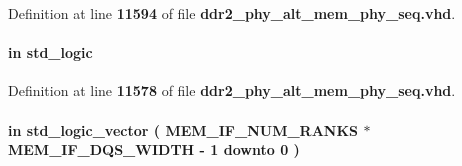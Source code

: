 Definition at line {\bf 11594} of file {\bf ddr2\+\_\+phy\+\_\+alt\+\_\+mem\+\_\+phy\+\_\+seq.\+vhd}.

\paragraph[{clk}]{ {\bfseries \textcolor{keywordflow}{in}\textcolor{vhdlchar}{ }} {\bfseries \textcolor{comment}{std\+\_\+logic}\textcolor{vhdlchar}{ }} \hspace{0.3cm}{\ttfamily [Port]}}\label{classddr2__phy__alt__mem__phy__ctrl_a4a4609c199d30b3adebbeb3a01276ec5}


Definition at line {\bf 11578} of file {\bf ddr2\+\_\+phy\+\_\+alt\+\_\+mem\+\_\+phy\+\_\+seq.\+vhd}.

\paragraph[{ctl\+\_\+cal\+\_\+byte\+\_\+lanes}]{ {\bfseries \textcolor{keywordflow}{in}\textcolor{vhdlchar}{ }} {\bfseries \textcolor{comment}{std\+\_\+logic\+\_\+vector}\textcolor{vhdlchar}{ }\textcolor{vhdlchar}{(}\textcolor{vhdlchar}{ }\textcolor{vhdlchar}{ }\textcolor{vhdlchar}{ }\textcolor{vhdlchar}{ }{\bfseries {\bf M\+E\+M\+\_\+\+I\+F\+\_\+\+N\+U\+M\+\_\+\+R\+A\+N\+KS}} \textcolor{vhdlchar}{$\ast$}\textcolor{vhdlchar}{ }\textcolor{vhdlchar}{ }\textcolor{vhdlchar}{ }{\bfseries {\bf M\+E\+M\+\_\+\+I\+F\+\_\+\+D\+Q\+S\+\_\+\+W\+I\+D\+TH}} \textcolor{vhdlchar}{-\/}\textcolor{vhdlchar}{ } \textcolor{vhdldigit}{1} \textcolor{vhdlchar}{ }\textcolor{keywordflow}{downto}\textcolor{vhdlchar}{ }\textcolor{vhdlchar}{ } \textcolor{vhdldigit}{0} \textcolor{vhdlchar}{ }\textcolor{vhdlchar}{)}\textcolor{vhdlchar}{ }} \hspace{0.3cm}{\ttfamily [Port]}}\label{classddr2__phy__alt__mem__phy__ctrl_ac5221c18f36d7f6115e50b151be873da}


